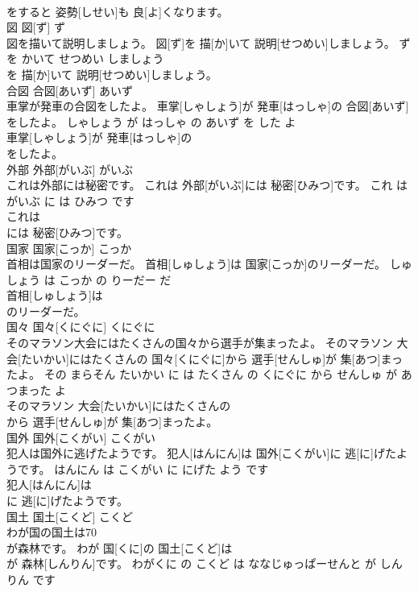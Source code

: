 \documentclass[8pt]{extreport}
\begin{document}
\begin{CJK}{UTF8}{min}
\\	をすると 姿勢[しせい]も 良[よ]くなります。			
\\	図	図[ず]	ず	
\\	図を描いて説明しましょう。	図[ず]を 描[か]いて 説明[せつめい]しましょう。	ず を かいて せつめい しましょう	
\\	を 描[か]いて 説明[せつめい]しましょう。			
\\	合図	合図[あいず]	あいず	
\\	車掌が発車の合図をしたよ。	車掌[しゃしょう]が 発車[はっしゃ]の 合図[あいず]をしたよ。	しゃしょう が はっしゃ の あいず を した よ	
\\	車掌[しゃしょう]が 発車[はっしゃ]の
\\	をしたよ。			
\\	外部	外部[がいぶ]	がいぶ	
\\	これは外部には秘密です。	これは 外部[がいぶ]には 秘密[ひみつ]です。	これ は がいぶ に は ひみつ です	
\\	これは
\\	には 秘密[ひみつ]です。			
\\	国家	国家[こっか]	こっか	
\\	首相は国家のリーダーだ。	首相[しゅしょう]は 国家[こっか]のリーダーだ。	しゅしょう は こっか の りーだー だ	
\\	首相[しゅしょう]は
\\	のリーダーだ。			
\\	国々	国々[くにぐに]	くにぐに	
\\	そのマラソン大会にはたくさんの国々から選手が集まったよ。	そのマラソン 大会[たいかい]にはたくさんの 国々[くにぐに]から 選手[せんしゅ]が 集[あつ]まったよ。	その まらそん たいかい に は たくさん の くにぐに から せんしゅ が あつまった よ	
\\	そのマラソン 大会[たいかい]にはたくさんの
\\	から 選手[せんしゅ]が 集[あつ]まったよ。			
\\	国外	国外[こくがい]	こくがい	
\\	犯人は国外に逃げたようです。	犯人[はんにん]は 国外[こくがい]に 逃[に]げたようです。	はんにん は こくがい に にげた よう です	
\\	犯人[はんにん]は
\\	に 逃[に]げたようです。			
\\	国土	国土[こくど]	こくど	
\\	わが国の国土は70
\\	が森林です。	わが 国[くに]の 国土[こくど]は 
\\	[ななじゅっぱーせんと]が 森林[しんりん]です。	わがくに の こくど は ななじゅっぱーせんと が しんりん です	

\end{CJK}
\end{document}
